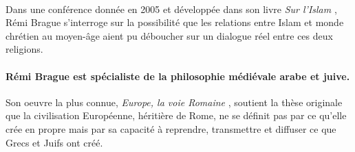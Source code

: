 
\begin{comment}

\paragraph{Instruction} 5000 signes, très synthétique. Fiche de lecture, idées principales du texte (plan haché : donc on peut rassembler les idées qui vient d'une conférence). Qui est Rémi Brague ? Quelle publication ? Arriver à la fois à faire des liens avec une séance de théologie ou d'histoire ?  En particulier lire Convivencia. Texte d'un chrétien. Deuxième partie est libre et on se permet sur 1/3 des signes, comment on a lu le texte "pas assez approfondi",... Se relire et éviter les fautes. 


Cette fiche de lecture, entre 4000 et 5000 caractères (espace compris), devra :  

- présenter brièvement  l'auteur de l'article

- mettre en évidence les idées fortes du texte dans un contexte d'intérêt croissant des chercheurs pour les relations entre musulmans et non-musulmans (cf. gros programme de recherche dirigé par John Tolan évoqué aujourd'hui)

- Votre conclusion, dense, vous permettra de faire un commentaire personnel sur les apports et limites de l'article, en le situant par rapport à la réflexion plus large que nous menons en cours et que vous entreprenez, de votre côté, par vos lectures personnelles
\end{comment}

 \paragraph{}
Dans une conférence donnée en 2005 \cite{lejbowicz_y_2005} et développée dans son livre \textit{Sur l'Islam} \cite{brague_sur_2023}, Rémi Brague  s'interroge sur la possibilité que les relations entre Islam et monde chrétien au moyen-âge aient pu déboucher sur un dialogue réel entre ces deux religions. 

\paragraph{Rémi Brague est spécialiste de la philosophie médiévale arabe et juive.} Son oeuvre la plus connue, \textit{Europe, la voie Romaine} \cite{brague_europe_2009}, soutient la thèse originale que la civilisation Européenne, héritière de Rome, ne se définit pas par ce qu'elle crée en propre mais par sa capacité à reprendre, transmettre et diffuser ce que Grecs et Juifs ont créé. 

